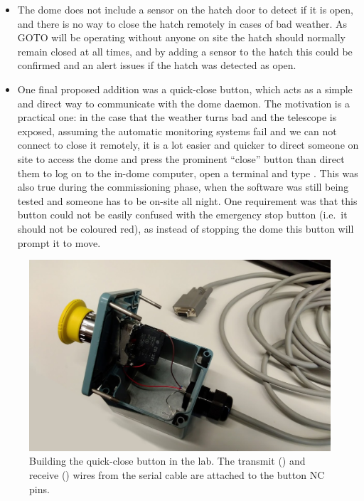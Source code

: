 \begin{colsection}
\begin{itemize}
    \item The dome does not include a sensor on the hatch door to detect if it is open, and there is no way to close the hatch remotely in cases of bad weather. As GOTO will be operating without anyone on site the hatch should normally remain closed at all times, and by adding a sensor to the hatch this could be confirmed and an alert issues if the hatch was detected as open.
    \item One final proposed addition was a quick-close button, which acts as a simple and direct way to communicate with the dome daemon. The motivation is a practical one: in the case that the weather turns bad and the telescope is exposed, assuming the automatic monitoring systems fail and we can not connect to close it remotely, it is a lot easier and quicker to direct someone on site to access the dome and press the prominent ``close'' button than direct them to log on to the in-dome computer, open a terminal and type . This was also true during the commissioning phase, when the software was still being tested and someone has to be on-site all night. One requirement was that this button could not be easily confused with the emergency stop button (i.e.\ it should not be coloured red), as instead of stopping the dome this button will prompt it to move.
\end{itemize}

\begin{figure}[t]
    \begin{center}
        \includegraphics[width=0.9\linewidth]{images/button_photo.jpg}
    \end{center}
    \caption[Building the quick-close button]{
        Building the quick-close button in the lab. The transmit () and receive () wires from the serial cable are attached to the button NC pins.
    }\label{fig:quickclose_button}
\end{figure}


\end{colsection}
